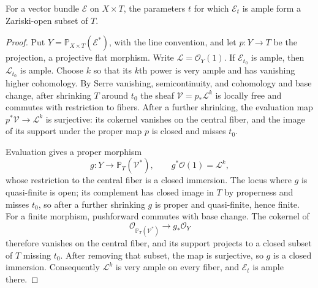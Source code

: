 \begin{lemma}\label{lem:hirzebruch-family-ample-open}
For a vector bundle $\mathcal E$ on $X\times T$, the parameters $t$ for which $\mathcal E_t$ is ample form a Zariski-open subset of $T$.
\end{lemma}
\begin{proof}
Put $Y=\mathbb P_{X\times T}(\mathcal E^*)$, with the line convention, and let $p\colon Y\to T$ be the projection, a projective flat morphism. Write $\mathcal L=\mathcal O_Y(1)$. If $\mathcal E_{t_0}$ is ample, then $\mathcal L_{t_0}$ is ample. Choose $k$ so that its $k$th power is very ample and has vanishing higher cohomology. By Serre vanishing, semicontinuity, and cohomology and base change, after shrinking $T$ around $t_0$ the sheaf $\mathcal V=p_*\mathcal L^k$ is locally free and commutes with restriction to fibers. After a further shrinking, the evaluation map $p^*\mathcal V\to\mathcal L^k$ is surjective: its cokernel vanishes on the central fiber, and the image of its support under the proper map $p$ is closed and misses $t_0$.

Evaluation gives a proper morphism
\[
 g\colon Y\longrightarrow\mathbb P_T(\mathcal V^*),
 \qquad g^*\mathcal O(1)=\mathcal L^k,
\]
whose restriction to the central fiber is a closed immersion. The locus where $g$ is quasi-finite is open; its complement has closed image in $T$ by properness and misses $t_0$, so after a further shrinking $g$ is proper and quasi-finite, hence finite. For a finite morphism, pushforward commutes with base change. The cokernel of
\[
 \mathcal O_{\mathbb P_T(\mathcal V^*)}\longrightarrow g_*\mathcal O_Y
\]
therefore vanishes on the central fiber, and its support projects to a closed subset of $T$ missing $t_0$. After removing that subset, the map is surjective, so $g$ is a closed immersion. Consequently $\mathcal L^k$ is very ample on every fiber, and $\mathcal E_t$ is ample there.
\end{proof}

